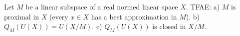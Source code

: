 Let $M$ be a linear subspace of a real normed linear space $X$. TFAE: a) $M$ is proximal in $X$ (every $x \in X$ has a best approximation in $M$). b) $Q_M(U(X)) = U(X/M)$. c) $Q_M(U(X))$ is closed in $X/M$.